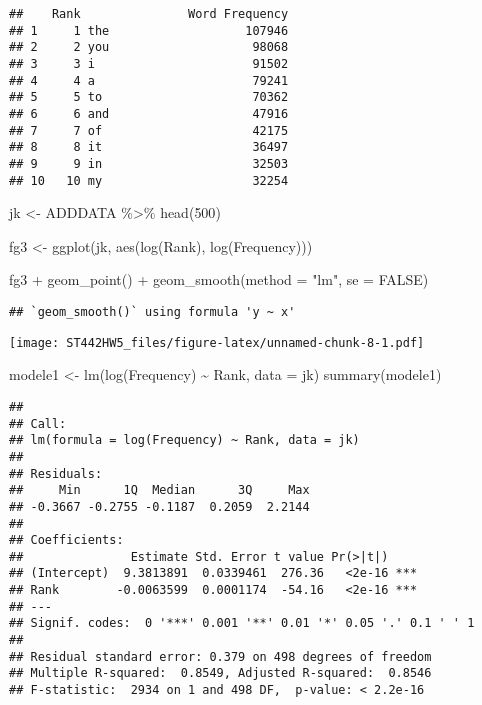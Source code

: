 \documentclass[
]{article}
\newenvironment{Shaded}{\begin{snugshade}}{\end{snugshade}}
\newcommand{\AttributeTok}[1]{\textcolor[rgb]{0.77,0.63,0.00}{#1}}
\newcommand{\ConstantTok}[1]{\textcolor[rgb]{0.00,0.00,0.00}{#1}}
\newcommand{\DecValTok}[1]{\textcolor[rgb]{0.00,0.00,0.81}{#1}}
\newcommand{\FunctionTok}[1]{\textcolor[rgb]{0.00,0.00,0.00}{#1}}
\newcommand{\NormalTok}[1]{#1}
\newcommand{\OtherTok}[1]{\textcolor[rgb]{0.56,0.35,0.01}{#1}}
\newcommand{\SpecialCharTok}[1]{\textcolor[rgb]{0.00,0.00,0.00}{#1}}
\newcommand{\StringTok}[1]{\textcolor[rgb]{0.31,0.60,0.02}{#1}}
\begin{document}
\begin{verbatim}
##    Rank               Word Frequency
## 1     1 the                   107946
## 2     2 you                    98068
## 3     3 i                      91502
## 4     4 a                      79241
## 5     5 to                     70362
## 6     6 and                    47916
## 7     7 of                     42175
## 8     8 it                     36497
## 9     9 in                     32503
## 10   10 my                     32254
\end{verbatim}

\begin{Shaded}
\begin{Highlighting}[]
\NormalTok{jk }\OtherTok{\textless{}{-}}\NormalTok{ ADDDATA }\SpecialCharTok{\%\textgreater{}\%} \FunctionTok{head}\NormalTok{(}\DecValTok{500}\NormalTok{)}

\NormalTok{fg3 }\OtherTok{\textless{}{-}} \FunctionTok{ggplot}\NormalTok{(jk, }\FunctionTok{aes}\NormalTok{(}\FunctionTok{log}\NormalTok{(Rank), }\FunctionTok{log}\NormalTok{(Frequency))) }

\NormalTok{fg3 }\SpecialCharTok{+} \FunctionTok{geom\_point}\NormalTok{() }\SpecialCharTok{+} \FunctionTok{geom\_smooth}\NormalTok{(}\AttributeTok{method =} \StringTok{"lm"}\NormalTok{, }\AttributeTok{se =} \ConstantTok{FALSE}\NormalTok{) }
\end{Highlighting}
\end{Shaded}

\begin{verbatim}
## `geom_smooth()` using formula 'y ~ x'
\end{verbatim}

\texttt{[image: ST442HW5\_files/figure-latex/unnamed-chunk-8-1.pdf]}

\begin{Shaded}
\begin{Highlighting}[]
\NormalTok{modele1 }\OtherTok{\textless{}{-}} \FunctionTok{lm}\NormalTok{(}\FunctionTok{log}\NormalTok{(Frequency) }\SpecialCharTok{\textasciitilde{}}\NormalTok{ Rank, }\AttributeTok{data =}\NormalTok{ jk)}
\FunctionTok{summary}\NormalTok{(modele1)}
\end{Highlighting}
\end{Shaded}

\begin{verbatim}
## 
## Call:
## lm(formula = log(Frequency) ~ Rank, data = jk)
## 
## Residuals:
##     Min      1Q  Median      3Q     Max 
## -0.3667 -0.2755 -0.1187  0.2059  2.2144 
## 
## Coefficients:
##               Estimate Std. Error t value Pr(>|t|)    
## (Intercept)  9.3813891  0.0339461  276.36   <2e-16 ***
## Rank        -0.0063599  0.0001174  -54.16   <2e-16 ***
## ---
## Signif. codes:  0 '***' 0.001 '**' 0.01 '*' 0.05 '.' 0.1 ' ' 1
## 
## Residual standard error: 0.379 on 498 degrees of freedom
## Multiple R-squared:  0.8549, Adjusted R-squared:  0.8546 
## F-statistic:  2934 on 1 and 498 DF,  p-value: < 2.2e-16
\end{verbatim}
\end{document}
